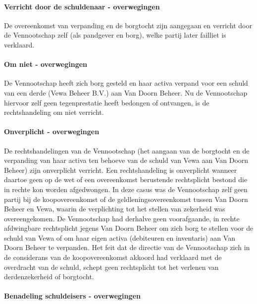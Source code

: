 \documentclass[
  dutch,
  a4paper,
]{article}
\begin{document}
\paragraph{Verricht door de schuldenaar - overwegingen}\label{verricht-door-de-schuldenaar---overwegingen-5}

De overeenkomst van verpanding en de borgtocht zijn aangegaan en verricht door de Vennootschap zelf (als pandgever en borg), welke partij later failliet is verklaard.

\paragraph{Om niet - overwegingen}\label{om-niet---overwegingen-5}

De Vennootschap heeft zich borg gesteld en haar activa verpand voor een schuld van een derde (Vewa Beheer B.V.) aan Van Doorn Beheer. Nu de Vennootschap hiervoor zelf geen tegenprestatie heeft bedongen of ontvangen, is de rechtshandeling om niet verricht.

\paragraph{Onverplicht - overwegingen}\label{onverplicht---overwegingen-5}

De rechtshandelingen van de Vennootschap (het aangaan van de borgtocht en de verpanding van haar activa ten behoeve van de schuld van Vewa aan Van Doorn Beheer) zijn onverplicht verricht. Een rechtshandeling is onverplicht wanneer daartoe geen op de wet of een overeenkomst berustende rechtsplicht bestond die in rechte kon worden afgedwongen. In deze casus was de Vennootschap zelf geen partij bij de koopovereenkomst of de geldleningsovereenkomst tussen Van Doorn Beheer en Vewa, waarin de verplichting tot het stellen van zekerheid was overeengekomen. De Vennootschap had derhalve geen voorafgaande, in rechte afdwingbare rechtsplicht jegens Van Doorn Beheer om zich borg te stellen voor de schuld van Vewa of om haar eigen activa (debiteuren en inventaris) aan Van Doorn Beheer te verpanden. Het feit dat de directie van de Vennootschap zich in de considerans van de koopovereenkomst akkoord had verklaard met de overdracht van de schuld, schept geen rechtsplicht tot het verlenen van derdenzekerheid of borgtocht.

\paragraph{Benadeling schuldeisers - overwegingen}\label{benadeling-schuldeisers---overwegingen-5}
\end{document}
